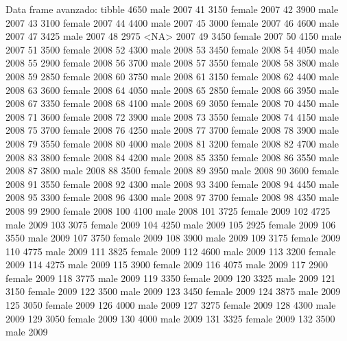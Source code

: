 \documentclass[
  ignorenonframetext,
  aspectratio=169]{beamer}
\let\oldverbatim\verbatim
\let\endoldverbatim\endverbatim
\renewenvironment{verbatim}{\tiny\oldverbatim}{\endoldverbatim}
\begin{document}
\begin{frame}[fragile]{Data frame avanzado: tibble}
\begin{verbatim}
40         4650   male 2007
41         3150 female 2007
42         3900   male 2007
43         3100 female 2007
44         4400   male 2007
45         3000 female 2007
46         4600   male 2007
47         3425   male 2007
48         2975   <NA> 2007
49         3450 female 2007
50         4150   male 2007
51         3500 female 2008
52         4300   male 2008
53         3450 female 2008
54         4050   male 2008
55         2900 female 2008
56         3700   male 2008
57         3550 female 2008
58         3800   male 2008
59         2850 female 2008
60         3750   male 2008
61         3150 female 2008
62         4400   male 2008
63         3600 female 2008
64         4050   male 2008
65         2850 female 2008
66         3950   male 2008
67         3350 female 2008
68         4100   male 2008
69         3050 female 2008
70         4450   male 2008
71         3600 female 2008
72         3900   male 2008
73         3550 female 2008
74         4150   male 2008
75         3700 female 2008
76         4250   male 2008
77         3700 female 2008
78         3900   male 2008
79         3550 female 2008
80         4000   male 2008
81         3200 female 2008
82         4700   male 2008
83         3800 female 2008
84         4200   male 2008
85         3350 female 2008
86         3550   male 2008
87         3800   male 2008
88         3500 female 2008
89         3950   male 2008
90         3600 female 2008
91         3550 female 2008
92         4300   male 2008
93         3400 female 2008
94         4450   male 2008
95         3300 female 2008
96         4300   male 2008
97         3700 female 2008
98         4350   male 2008
99         2900 female 2008
100        4100   male 2008
101        3725 female 2009
102        4725   male 2009
103        3075 female 2009
104        4250   male 2009
105        2925 female 2009
106        3550   male 2009
107        3750 female 2009
108        3900   male 2009
109        3175 female 2009
110        4775   male 2009
111        3825 female 2009
112        4600   male 2009
113        3200 female 2009
114        4275   male 2009
115        3900 female 2009
116        4075   male 2009
117        2900 female 2009
118        3775   male 2009
119        3350 female 2009
120        3325   male 2009
121        3150 female 2009
122        3500   male 2009
123        3450 female 2009
124        3875   male 2009
125        3050 female 2009
126        4000   male 2009
127        3275 female 2009
128        4300   male 2009
129        3050 female 2009
130        4000   male 2009
131        3325 female 2009
132        3500   male 2009

\end{verbatim}
\end{frame}
\end{document}
